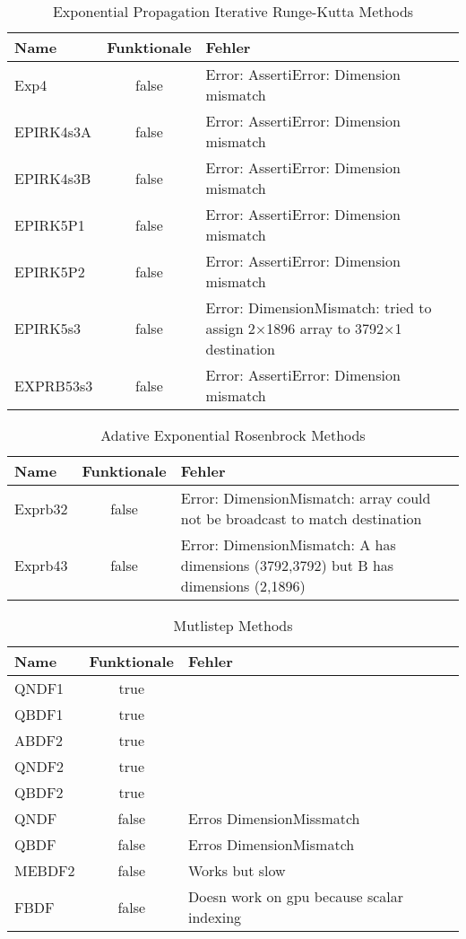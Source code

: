 \begin{table}[]
    \centering

    \begin{tabular}{p{5cm}|c|p{5cm}}
        Name & Funktionale & Fehler \\
        \hline\hline
        Exp4      & false & Error: AssertiError: Dimension mismatch \\
        EPIRK4s3A & false & Error: AssertiError: Dimension mismatch \\
        EPIRK4s3B & false & Error: AssertiError: Dimension mismatch \\
        EPIRK5P1  & false & Error: AssertiError: Dimension mismatch \\
        EPIRK5P2  & false & Error: AssertiError: Dimension mismatch \\
        EPIRK5s3  & false & Error: DimensionMismatch: tried to assign 2×1896 array to 3792×1 destination \\
        EXPRB53s3 & false & Error: AssertiError: Dimension mismatch \\
    \end{tabular}
    \caption{Exponential Propagation Iterative Runge-Kutta Methods}
    \label{tab:my_label}
\end{table}

\begin{table}[]
    \centering

    \begin{tabular}{p{5cm}|c|p{5cm}}
        Name & Funktionale & Fehler \\
        \hline\hline
        Exprb32 & false & Error: DimensionMismatch: array could not be broadcast to match destination \\
        Exprb43 & false & Error: DimensionMismatch: A has dimensions (3792,3792) but B has dimensions (2,1896) \\       
    \end{tabular}
    \caption{Adative Exponential Rosenbrock Methods}
    \label{tab:my_label}
\end{table}

\begin{table}[]
    \centering

    \begin{tabular}{p{5cm}|c|p{5cm}}
        Name & Funktionale & Fehler \\
        \hline\hline
        QNDF1 & true   & \\
        QBDF1 & true   & \\
        ABDF2 & true   & \\
        QNDF2 & true   & \\
        QBDF2 & true   & \\
        QNDF  & false  & Erros DimensionMissmatch \\
        QBDF  & false  & Erros DimensionMismatch \\
        MEBDF2& false  & Works but slow \\
        FBDF  & false  & Doesn work on gpu because scalar indexing \\
    \end{tabular}
    \caption{Mutlistep Methods}
    \label{tab:my_label}
\end{table}

